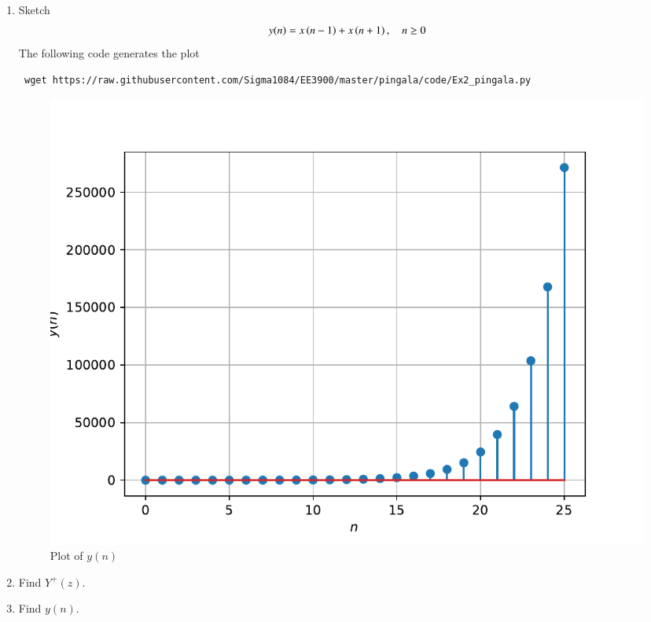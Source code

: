 \documentclass[journal,12pt,twocolumn]{IEEEtran}
\renewcommand\thesection{\arabic{section}}
\begin{document}
\begin{enumerate}[label=\thesection.\arabic*,ref=\thesection.\theenumi]
\item Sketch
	\begin{align}
		y(n) = x\left(n-1\right) + x\left(n+1\right), \quad n \ge 0
		\label{eq:10-orig-diff-rev}
 	\end{align}
	 \solution The following code generates the plot
	 \begin{lstlisting}
 wget https://raw.githubusercontent.com/Sigma1084/EE3900/master/pingala/code/Ex2_pingala.py
	 \end{lstlisting}
	 \begin{figure}[!htp]
		 \includegraphics[width=\columnwidth]{../figs/y_n.pdf}
		 \caption{Plot of $y(n)$}
		 \label{fig:y-n}
	 \end{figure}

\item Find $Y^{+}(z)$. 
\item Find $y(n)$.
\end{enumerate}
\end{document}
